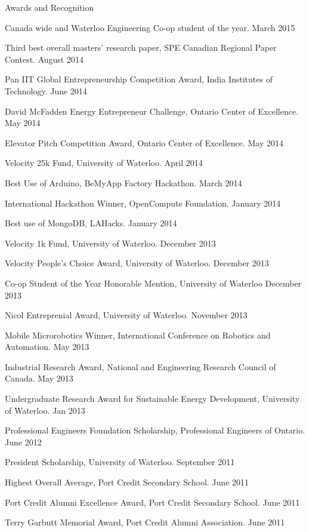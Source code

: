 \documentclass{resume} %
\begin{document}
\begin{rSection}{Awards and Recognition}
\item Canada wide and Waterloo Engineering Co-op student of the year. March 2015

\item Third best overall  masters' research paper,  SPE Canadian Regional Paper Contest. August 2014
\item Pan IIT Global Entrepreneurship Competition Award, India Institutes of Technology.  June 2014
\item David McFadden Energy Entrepreneur Challenge, Ontario Center of Excellence. May 2014
\item Elevator Pitch Competition Award, Ontario Center of Excellence.  May 2014
\item Velocity 25k Fund, University of Waterloo.  April 2014
\item Best Use of Arduino, BeMyApp Factory Hackathon. March 2014
\item International Hackathon Winner, OpenCompute Foundation. January 2014
\item Best use of MongoDB, LAHacks. January 2014
\item Velocity 1k Fund, University of Waterloo. December 2013
\item Velocity People's Choice Award, University of Waterloo. December 2013
\item Co-op Student of the Year Honorable Mention, University of Waterloo December 2013
\item Nicol Entreprenial Award, University of Waterloo. November 2013
\item Mobile Microrobotics Winner, International Conference on Robotics and Automation. May 2013
\item Industrial Research Award, National and Engineering Research Council of Canada. May 2013
\item Undergraduate Research Award for Sustainable Energy Development, University of Waterloo. Jan 2013
\item Professional Engineers Foundation Scholarship, Professional Engineers of Ontario. June 2012
\item President Scholarship, University of Waterloo. September 2011
\item Highest Overall Average, Port Credit Secondary School.	 June 2011
\item Port Credit Alumni Excellence Award, Port Credit Secondary School. June 2011
\item Terry Garbutt Memorial Award, Port Credit Alumni Association. June 2011

\end{rSection}
\end{document}
